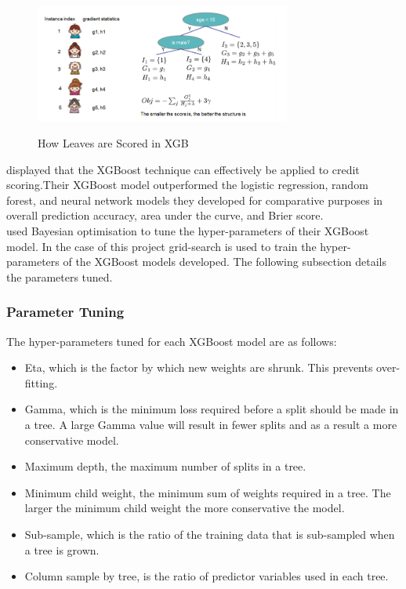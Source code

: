 \vspace{10 pt}

\begin{figure}[!htb]
\centering
\includegraphics[width=0.75\textwidth]{images/tree_score.png}
\caption{How Leaves are Scored in XGB}
\label{fig:xgb_score}
\parencite{XGBoost}
\end{figure}

\vspace{10 pt}


\textcite{Ensemble} displayed that the XGBoost technique can effectively be applied to credit scoring.Their XGBoost model outperformed the logistic regression, random forest, and neural network models they developed for comparative purposes in overall prediction accuracy, area under the curve, and Brier score. \\


\textcite{Ensemble} used Bayesian optimisation to tune the hyper-parameters of their XGBoost model. In the case of this project grid-search is used to train the hyper-parameters of the XGBoost models developed. The following subsection details the parameters tuned. 

\subsubsection{Parameter Tuning}

The hyper-parameters tuned for each XGBoost model are as follows:

\begin{itemize}
    \item Eta, which is the factor by which new weights are shrunk. This prevents over-fitting.  
    \item Gamma, which is the minimum loss required before a split should be made in a tree. A large Gamma value will result in fewer splits and as a result a more conservative model. 
    \item Maximum depth, the maximum number of splits in a tree. 
    \item Minimum child weight, the minimum sum of weights required in a tree. The larger the minimum child weight the more conservative the model. 
    \item Sub-sample, which is the ratio of the training data that is sub-sampled when a tree is grown. 
    \item Column sample by tree, is the ratio of predictor variables used in each tree. 
\end{itemize}

